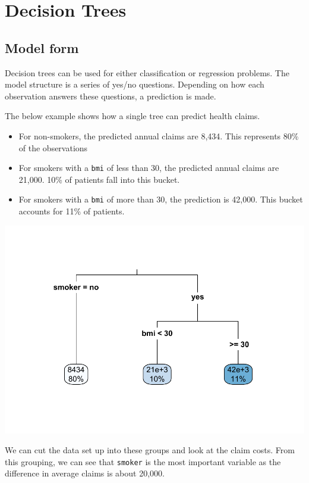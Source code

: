 \documentclass[openany]{book}
\providecommand{\tightlist}{%
  \setlength{\itemsep}{0pt}\setlength{\parskip}{0pt}}
\begin{document}
\hypertarget{decision-trees}{%
\section{Decision Trees}\label{decision-trees}}

\hypertarget{model-form-1}{%
\subsection{Model form}\label{model-form-1}}

Decision trees can be used for either classification or regression problems. The model structure is a series of yes/no questions. Depending on how each observation answers these questions, a prediction is made.

The below example shows how a single tree can predict health claims.

\begin{itemize}
\tightlist
\item
  For non-smokers, the predicted annual claims are 8,434. This represents 80\% of the observations
\item
  For smokers with a \texttt{bmi} of less than 30, the predicted annual claims are 21,000. 10\% of patients fall into this bucket.
\item
  For smokers with a \texttt{bmi} of more than 30, the prediction is 42,000. This bucket accounts for 11\% of patients.
\end{itemize}

\includegraphics{06-tree-based-models_files/figure-latex/unnamed-chunk-2-1.pdf}

We can cut the data set up into these groups and look at the claim costs. From this grouping, we can see that \texttt{smoker} is the most important variable as the difference in average claims is about 20,000.
\end{document}
